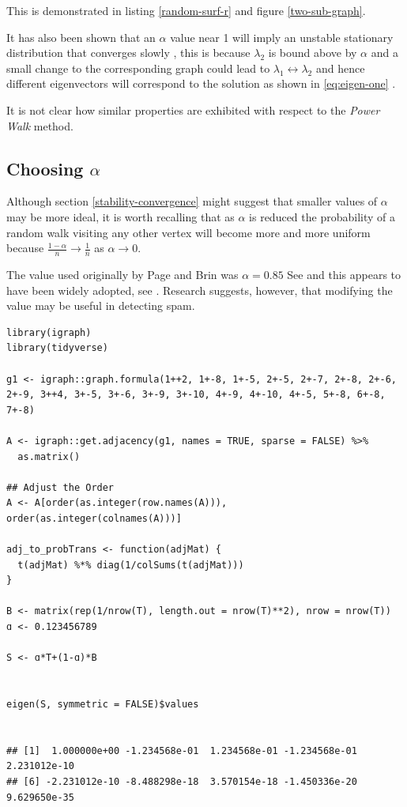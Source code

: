 \documentclass[11pt]{article}
\begin{document}
This is demonstrated in listing \ref{random-surf-r} and figure \ref{two-sub-graph}.

It has also been shown that an \(\alpha\) value near 1 will imply an unstable
stationary distribution \cite{ngStableAlgorithmsLink2001} that converges slowly
\cite{tanNewExtrapolationMethod2017a}, this is because \(\lambda_{2}\) is bound above by
\(\alpha\) and a small change to the corresponding graph could lead to
\(\lambda_{1} \leftrightarrow \lambda_{2}\) and hence different eigenvectors will
correspond to the solution as shown in \eqref{eq:eigen-one} .

It is not clear how similar properties are exhibited with respect to the \emph{Power Walk} method. \cite{parkPowerWalkRevisiting2013}

\subsection{Choosing \(\alpha\)}
\label{choosing-alpha}
Although section \ref{stability-convergence} might suggest that smaller values of
\(\alpha\) may be more ideal, it is worth recalling that as \(\alpha\) is reduced
the probability of a random walk visiting any other vertex will become more and
more uniform because \(\frac{1-\alpha}{n} \rightarrow \frac{1}{n}\) as \(\alpha
\rightarrow 0\). \cite{parkPowerWalkRevisiting2013}

The value used originally by Page and Brin was \(\alpha = 0.85\) See
\cite[p. 109]{larrypageAnatomyLargescaleHypertextual1998} and this appears to have been
widely adopted, see
\cite{kamvarAdaptiveMethodsComputation2004b,boldiPageRankFunctionDamping2005}.
Research suggests, however, that modifying the value may be useful in detecting
spam.
\cite{zhangMakingEigenvectorBasedReputation2004,boldiPageRankFunctionDamping2005}


\begin{lstlisting}
library(igraph)
library(tidyverse)

g1 <- igraph::graph.formula(1++2, 1+-8, 1+-5, 2+-5, 2+-7, 2+-8, 2+-6, 2+-9, 3++4, 3+-5, 3+-6, 3+-9, 3+-10, 4+-9, 4+-10, 4+-5, 5+-8, 6+-8, 7+-8)

A <- igraph::get.adjacency(g1, names = TRUE, sparse = FALSE) %>%
  as.matrix()

## Adjust the Order
A <- A[order(as.integer(row.names(A))), order(as.integer(colnames(A)))]

adj_to_probTrans <- function(adjMat) {
  t(adjMat) %*% diag(1/colSums(t(adjMat)))
}

B <- matrix(rep(1/nrow(T), length.out = nrow(T)**2), nrow = nrow(T))
ɑ <- 0.123456789

S <- ɑ*T+(1-ɑ)*B


eigen(S, symmetric = FALSE)$values


## [1]  1.000000e+00 -1.234568e-01  1.234568e-01 -1.234568e-01  2.231012e-10
## [6] -2.231012e-10 -8.488298e-18  3.570154e-18 -1.450336e-20  9.629650e-35
\end{lstlisting}
\end{document}
